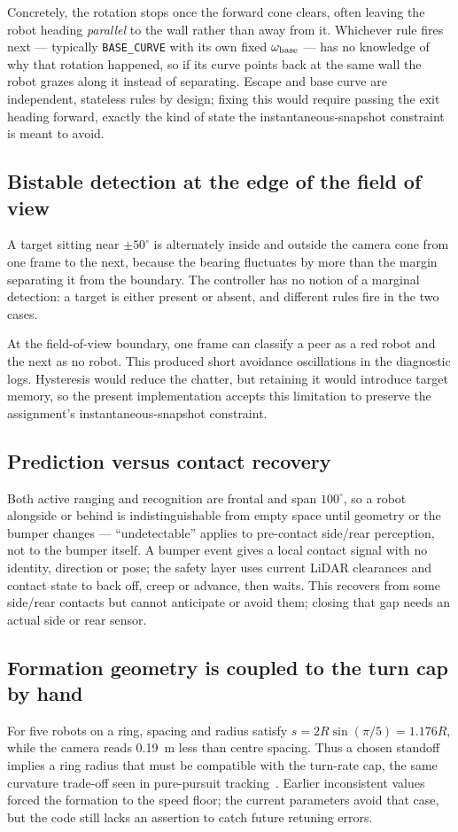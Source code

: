 \documentclass[conference,a4paper]{IEEEtran}
\begin{document}
Concretely, the rotation stops once the forward cone clears, often leaving
the robot heading \emph{parallel} to the wall rather than away from it.
Whichever rule fires next --- typically \texttt{BASE\_CURVE} with its own
fixed $\omega_{\rm base}$ --- has no knowledge of why that rotation
happened, so if its curve points back at the same wall the robot grazes
along it instead of separating. Escape and base curve are independent,
stateless rules by design; fixing this would require passing the exit
heading forward, exactly the kind of state the instantaneous-snapshot
constraint is meant to avoid.

\subsection{Bistable detection at the edge of the field of view}
A target sitting near $\pm50^\circ$ is alternately inside and outside the
camera cone from one frame to the next, because the bearing fluctuates by
more than the margin separating it from the boundary. The controller has no
notion of a marginal detection: a target is either present or absent, and
different rules fire in the two cases.

At the field-of-view boundary, one frame can classify a peer as a red robot
and the next as no robot. This produced short avoidance oscillations in the
diagnostic logs. Hysteresis would reduce the chatter, but retaining it would
introduce target memory, so the present implementation accepts this limitation
to preserve the assignment's instantaneous-snapshot constraint.

\subsection{Prediction versus contact recovery}
Both active ranging and recognition are frontal and span $100^\circ$, so a
robot alongside or behind is indistinguishable from empty space until
geometry or the bumper changes --- ``undetectable'' applies to pre-contact
side/rear perception, not to the bumper itself. A bumper event gives a local
contact signal with no identity, direction or pose; the safety layer uses
current LiDAR clearances and contact state to back off, creep or advance,
then waits. This recovers from some side/rear contacts but cannot anticipate
or avoid them; closing that gap needs an actual side or rear sensor.

\subsection{Formation geometry is coupled to the turn cap by hand}
For five robots on a ring, spacing and radius satisfy
$s=2R\sin(\pi/5)=1.176R$, while the camera reads \SI{0.19}{\metre} less than
centre spacing. Thus a chosen standoff implies a ring radius that must be
compatible with the turn-rate cap, the same curvature trade-off seen in
pure-pursuit tracking~\cite{coulter1992}. Earlier inconsistent values forced
the formation to the speed floor; the current parameters avoid that case, but
the code still lacks an assertion to catch future retuning errors.
\end{document}
